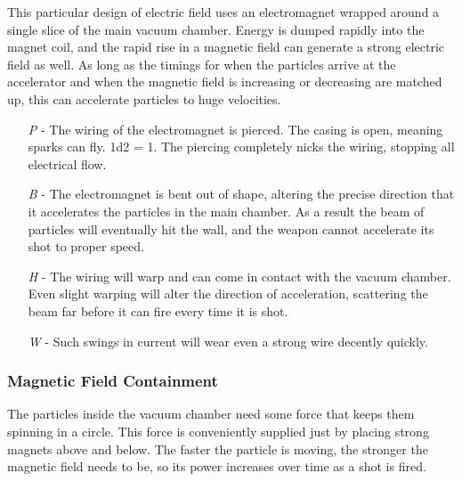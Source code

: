 \documentclass[a4paper]{article}
\begin{document}
This particular design of electric field uses an electromagnet wrapped around a single slice of the main vacuum chamber. Energy is dumped rapidly into the magnet coil, and the rapid rise in a magnetic field can generate a strong electric field as well. As long as the timings for when the particles arrive at the accelerator and when the magnetic field is increasing or decreasing are matched up, this can accelerate particles to huge velocities.
\begin{enumerate}
\item [\textit{P}] - The wiring of the electromagnet is pierced. The casing is open, meaning sparks can fly. \newline \hspace*{3pt} 1d2 = 1. The piercing completely nicks the wiring, stopping all electrical flow.
\item [\textit{B}] - The electromagnet is bent out of shape, altering the precise direction that it accelerates the particles in the main chamber. As a result the beam of particles will eventually hit the wall, and the weapon cannot accelerate its shot to proper speed.
\item [\textit{H}] - The wiring will warp and can come in contact with the vacuum chamber. Even slight warping will alter the direction of acceleration, scattering the beam far before it can fire every time it is shot.
\item [\textit{W}] - Such swings in current will wear even a strong wire decently quickly.
\end{enumerate}

\vspace{-0.5cm} \hspace{-18pt} \subsubsection{Magnetic Field Containment} \label{ray_containment} \vspace{-0.2cm}
The particles inside the vacuum chamber need some force that keeps them spinning in a circle. This force is conveniently supplied just by placing strong magnets above and below. The faster the particle is moving, the stronger the magnetic field needs to be, so its power increases over time as a shot is fired.
\end{document}
